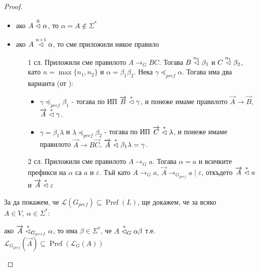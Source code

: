 \begin{proof}
    \begin{itemize}
        \item ако $A \stackrel{0}{\vartriangleleft} \alpha$, то $\alpha = A \notin \Sigma^*$ \checkmark
        \item ако $A \stackrel{n + 1}{\vartriangleleft} \alpha$, то сме приложили някое правило
              \begin{itemize}
                  \item[1 сл.] Приложили сме правилото $A \rightarrow_G BC$.
                      Тогава $B \stackrel{n_1}{\vartriangleleft} \beta_1$ и $C \stackrel{n_1}{\vartriangleleft} \beta_2$, като $n = \max \{ n_1, n_2 \}$ и $\alpha = \beta_1 \beta_2$.
                      Нека $\gamma \preceq_{pref} \alpha$.
                      Тогава има два варианта (от ):
                      \begin{itemize}
                          \item $\gamma \preceq_{pref} \beta_1$ - тогава по ИП $\overrightarrow{B} \stackrel{*}{\vartriangleleft} \gamma$, и понеже имаме правилото $\overrightarrow{A} \rightarrow \overrightarrow{B}$, $\overrightarrow{A} \stackrel{*}{\vartriangleleft} \gamma$.
                          \item $\gamma = \beta_1 \lambda$ и $\lambda \preceq_{pref} \beta_2$ - тогава по ИП $\overrightarrow{C} \stackrel{*}{\vartriangleleft} \lambda$, и понеже имаме правилото $\overrightarrow{A} \rightarrow B \overrightarrow{C}$, $\overrightarrow{A} \stackrel{*}{\vartriangleleft} \beta_1 \lambda = \gamma$.
                      \end{itemize}
                  \item[2 сл.] Приложили сме правилото $A \rightarrow_G a$.
                      Тогава $\alpha = a$ и всичките префикси на $\alpha$ са $a$ и $\varepsilon$.
                      Тъй като $A \rightarrow_G a$, $\overrightarrow{A} \rightarrow_{G_{pref}} a \mid \varepsilon$, откъдето $\overrightarrow{A} \stackrel{*}{\vartriangleleft} a$ и $\overrightarrow{A} \stackrel{*}{\vartriangleleft} \varepsilon$
              \end{itemize}
    \end{itemize}

    За да покажем, че $\mathcal{L}(G_{pref}) \subseteq \operatorname{Pref}(L)$, ще докажем, че за всяко $A \in V, \: \alpha \in \Sigma^*$:

    \begin{center}
        ако $\overrightarrow{A} \stackrel{*}{\vartriangleleft}_{G_{pref}} \alpha$, то има $\beta \in \Sigma^*$, че $A \stackrel{*}{\vartriangleleft}_G \alpha \beta$ т.е. $\mathcal{L}_{G_{pref}}(\overrightarrow{A}) \subseteq \operatorname{Pref}(\mathcal{L}_G(A))$
    \end{center}


\end{proof}
